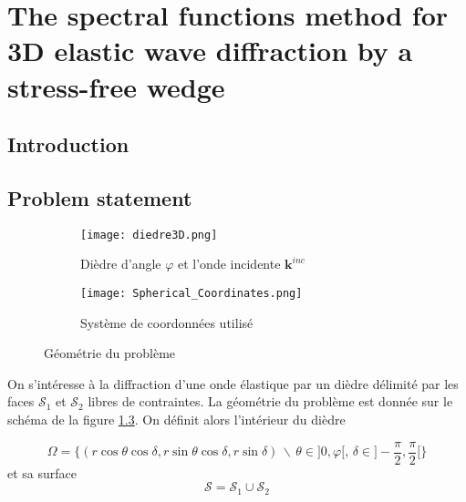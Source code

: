 \chapter[][3D Elastic Case]{The spectral functions method for 3D elastic wave diffraction by a stress-free wedge}
\label{chap-3D}

\section*{Introduction}

\section{Problem statement}

\begin{figure}[h]
\centering
\begin{subfigure}[b]{0.65\textwidth}
	\texttt{[image: diedre3D.png]}
	\caption{Dièdre d'angle $\varphi$ et l'onde incidente $\textbf{k}^{inc}$}
	\label{diedre}
\end{subfigure}
\hfill
\begin{subfigure}[b]{0.3\textwidth}
	\texttt{[image: Spherical\_Coordinates.png]}
	\caption{Système de coordonnées utilisé}
	\label{coords}
\end{subfigure}
\caption{Géométrie du problème}
\label{diedre_coords}
\end{figure}

On s'intéresse à la diffraction d'une onde élastique par un dièdre délimité par les faces $\mathcal{S}_1$ et $\mathcal{S}_2$ libres de contraintes. La géométrie du problème est donnée sur le schéma de la figure \ref{diedre_coords}. On définit alors l'intérieur du dièdre 

$$\Omega=\{ (r\cos \theta \cos \delta, r \sin \theta \cos \delta, r \sin \delta)\, \backslash \, \theta \in \rbrack 0, \varphi \lbrack, \, \delta \in \rbrack -\frac{\pi}{2}, \frac{\pi}{2} \lbrack \} $$
et sa surface
$$ \mathcal{S}=\mathcal{S}_1 \cup \mathcal{S}_2 $$


